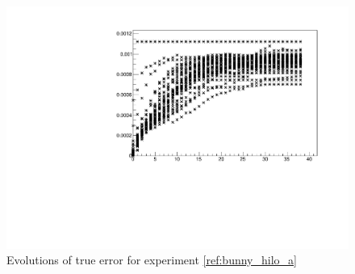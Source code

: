 \begin{figure}[H]
\centering
\includegraphics[width=.7\textwidth]{fig/bunny_globmin_ev.pdf}
\caption{Evolutions of true error for experiment \ref{ref:bunny_hilo_a}}
\label{ref:bunny_hilo_ev}
\end{figure}
